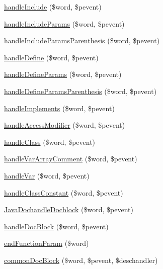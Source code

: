 \begin{DoxyCompactItemize}
\item 
\hyperlink{classphp_documentor_t_parser_a1b742d68b058777a3f988586ef65cfa8}{handle\-Include} (\$word, \$pevent)
\item 
\hyperlink{classphp_documentor_t_parser_a1ccec62796a1533aec70e714836f5308}{handle\-Include\-Params} (\$word, \$pevent)
\item 
\hyperlink{classphp_documentor_t_parser_a94e6ccd54479e64f549a79423be75220}{handle\-Include\-Params\-Parenthesis} (\$word, \$pevent)
\item 
\hyperlink{classphp_documentor_t_parser_a1769290b6b18b684616582c0db6bd0dd}{handle\-Define} (\$word, \$pevent)
\item 
\hyperlink{classphp_documentor_t_parser_accf0d45bf57d1bb5716638ed6c3ad4b0}{handle\-Define\-Params} (\$word, \$pevent)
\item 
\hyperlink{classphp_documentor_t_parser_a9a9bd626fd0ac06e0851f2411449270a}{handle\-Define\-Params\-Parenthesis} (\$word, \$pevent)
\item 
\hyperlink{classphp_documentor_t_parser_a9926f01068175b139d70ce9d76faa5de}{handle\-Implements} (\$word, \$pevent)
\item 
\hyperlink{classphp_documentor_t_parser_a6146f01dd2faa2b49ff9addaa28537a2}{handle\-Access\-Modifier} (\$word, \$pevent)
\item 
\hyperlink{classphp_documentor_t_parser_a3a3555968696bdaf66a627ebedc5e4aa}{handle\-Class} (\$word, \$pevent)
\item 
\hyperlink{classphp_documentor_t_parser_a2b358088ddb5b726788acf05bec9610a}{handle\-Var\-Array\-Comment} (\$word, \$pevent)
\item 
\hyperlink{classphp_documentor_t_parser_a5e19ceeed570fa556cfa546f730a093d}{handle\-Var} (\$word, \$pevent)
\item 
\hyperlink{classphp_documentor_t_parser_a5336d3607cbf7d588708b0ed2c8cc4bf}{handle\-Class\-Constant} (\$word, \$pevent)
\item 
\hyperlink{classphp_documentor_t_parser_a8621e54d2f0eda7024fe6dafcd1ce6a8}{\-Java\-Dochandle\-Docblock} (\$word, \$pevent)
\item 
\hyperlink{classphp_documentor_t_parser_a38bc1e0a6586b0f2aac2cd0968db0bd3}{handle\-Doc\-Block} (\$word, \$pevent)
\item 
\hyperlink{classphp_documentor_t_parser_a1bf75b45723f236dc492dd5e1d9bebaf}{end\-Function\-Param} (\$word)
\item 
\hyperlink{classphp_documentor_t_parser_a6317202c942d515715ca91916a30ab53}{common\-Doc\-Block} (\$word, \$pevent, \$deschandler)

\end{DoxyCompactItemize}
